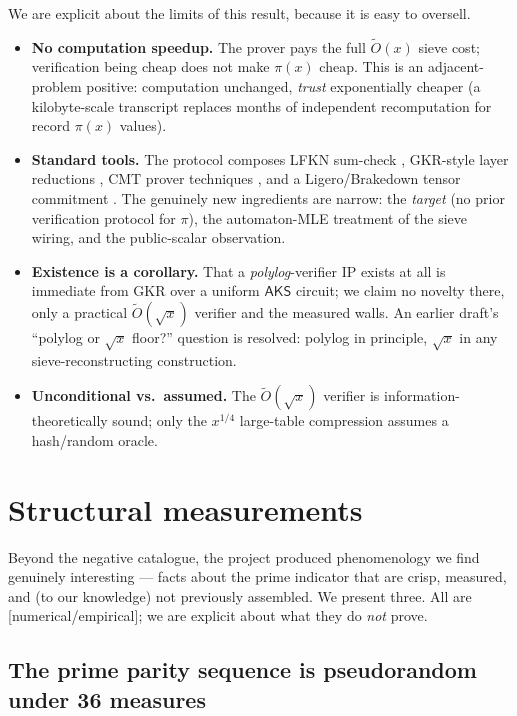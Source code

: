 \documentclass[11pt]{article}
\theoremstyle{plain}
\theoremstyle{definition}
\theoremstyle{remark}
\newcommand{\statline}[1]{\textnormal{\footnotesize\textsf{[\textcolor{accent}{#1}]}}}
\newcommand{\Otil}{\widetilde{O}}
\begin{document}
We are explicit about the limits of this result, because it is easy to oversell.
\begin{itemize}[leftmargin=1.4em,itemsep=2pt]
\item \textbf{No computation speedup.} The prover pays the full $\Otil(x)$ sieve
cost; verification being cheap does not make $\pi(x)$ cheap. This is an
adjacent-problem positive: computation unchanged, \emph{trust} exponentially
cheaper (a kilobyte-scale transcript replaces months of independent recomputation
for record $\pi(x)$ values).
\item \textbf{Standard tools.} The protocol composes LFKN sum-check
\cite{lfkn1992}, GKR-style layer reductions \cite{gkr2015}, CMT prover techniques
\cite{cmt2012}, and a Ligero/Brakedown tensor commitment
\cite{ligero2017,brakedown2023}. The genuinely new ingredients are narrow: the
\emph{target} (no prior verification protocol for $\pi$), the automaton-MLE
treatment of the sieve wiring, and the public-scalar observation.
\item \textbf{Existence is a corollary.} That a \emph{polylog}-verifier IP exists
at all is immediate from GKR over a uniform $\mathsf{AKS}$ circuit; we claim no
novelty there, only a practical $\Otil(\sqrt{x})$ verifier and the measured
walls. An earlier draft's ``polylog or $\sqrt{x}$ floor?'' question is resolved:
polylog in principle, $\sqrt{x}$ in any sieve-reconstructing construction.
\item \textbf{Unconditional vs.\ assumed.} The $\Otil(\sqrt{x})$ verifier is
information-theoretically sound; only the $x^{1/4}$ large-table compression
assumes a hash/random oracle.
\end{itemize}

\section{Structural measurements}
\label{sec:structural}

Beyond the negative catalogue, the project produced phenomenology we find
genuinely interesting --- facts about the prime indicator that are crisp,
measured, and (to our knowledge) not previously assembled. We present three.
All are \statline{numerical/empirical}; we are explicit about what they do
\emph{not} prove.

\subsection{The prime parity sequence is pseudorandom under 36 measures}
\end{document}
